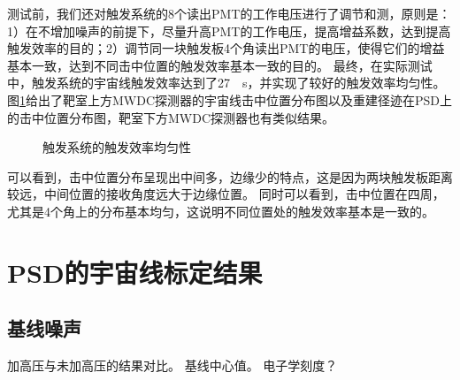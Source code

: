 测试前，我们还对触发系统的8个读出PMT的工作电压进行了调节和测，原则是：1）在不增加噪声的前提下，尽量升高PMT的工作电压，提高增益系数，达到提高触发效率的目的；2）调节同一块触发板4个角读出PMT的电压，使得它们的增益基本一致，达到不同击中位置的触发效率基本一致的目的。
最终，在实际测试中，触发系统的宇宙线触发效率达到了\SI{27}{\per\second}，并实现了较好的触发效率均匀性。
图\ref{fig:cosmic_ray:hitposition}给出了靶室上方MWDC探测器的宇宙线击中位置分布图以及重建径迹在PSD上的击中位置分布图，靶室下方MWDC探测器也有类似结果。
\begin{figure}[htb]
\centering
{}
{}
\caption{触发系统的触发效率均匀性}
\label{fig:cosmic_ray:hitposition}
\end{figure}
可以看到，击中位置分布呈现出中间多，边缘少的特点，这是因为两块触发板距离较远，中间位置的接收角度远大于边缘位置。
同时可以看到，击中位置在四周，尤其是4个角上的分布基本均匀，这说明不同位置处的触发效率基本是一致的。

\section{PSD的宇宙线标定结果}
\label{sec:cosmic_ray:results}
\subsection{基线噪声}
加高压与未加高压的结果对比。
基线中心值。
电子学刻度？

